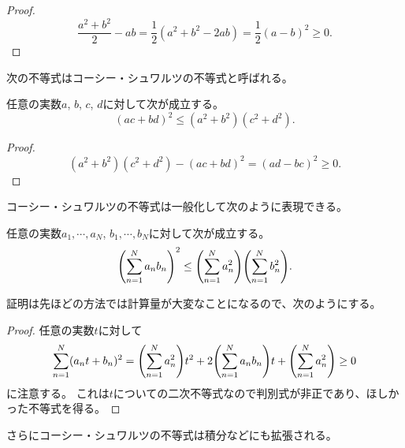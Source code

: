 \begin{proof}
$$
\frac{a^2+b^2}{2}-a b
= \frac{1}{2}(a^2+b^2-2 a b)
= \frac{1}{2}(a-b)^2 \ge 0.
$$
\end{proof}

次の不等式はコーシー・シュワルツの不等式と呼ばれる。

\begin{proposition}
任意の実数$a$, $b$, $c$, $d$に対して次が成立する。
$$
(a c+b d)^2 \le (a^2+b^2)(c^2+d^2).
$$
\end{proposition}

\begin{proof}
$$
(a^2+b^2)(c^2+d^2)-(a c+b d)^2 = (a d-b c)^2 \ge 0.
$$
\end{proof}

コーシー・シュワルツの不等式は一般化して次のように表現できる。

\begin{proposition}
任意の実数$a_1, \cdots, a_N$, $b_1, \cdots, b_N$に対して次が成立する。
$$
\qty(\sum_{n = 1}^N a_n b_n)^2 \le \qty(\sum_{n = 1}^N a_n^2)\qty(\sum_{n = 1}^N b_n^2).
$$
\end{proposition}

証明は先ほどの方法では計算量が大変なことになるので、次のようにする。

\begin{proof}
任意の実数$t$に対して
$$
\sum_{n = 1}^N (a_n t+b_n)^2 = \qty(\sum_{n = 1}^N a_n^2)t^2+2\qty(\sum_{n = 1}^N a_n b_n)t+\qty(\sum_{n = 1}^N a_n^2) \ge 0
$$
に注意する。
これは$t$についての二次不等式なので判別式が非正であり、ほしかった不等式を得る。
\end{proof}

さらにコーシー・シュワルツの不等式は積分などにも拡張される。
